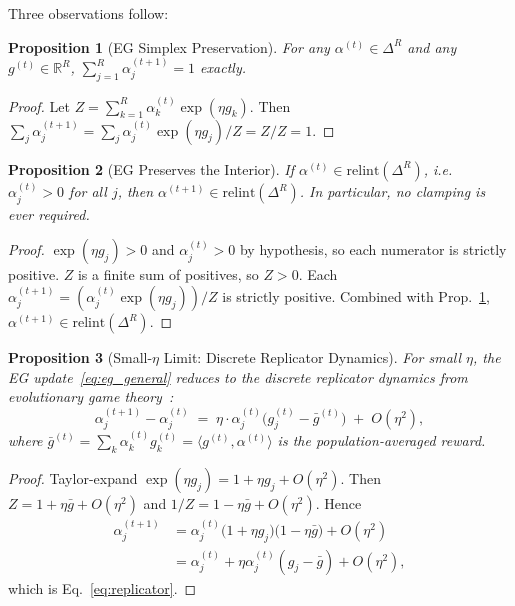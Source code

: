 \documentclass[11pt,a4paper]{article}
\theoremstyle{definition}
\theoremstyle{plain}
\newtheorem{proposition}{Proposition}[section]
\begin{document}
\noindent Three observations follow:

\begin{proposition}[EG Simplex Preservation]
\label{prop:eg_simplex}
For any $\alpha^{(t)} \in \Delta^R$ and any $g^{(t)} \in \mathbb{R}^R$,
$\sum_{j=1}^{R} \alpha_j^{(t+1)} = 1$ exactly.
\end{proposition}
\begin{proof}
Let $Z = \sum_{k=1}^{R} \alpha_k^{(t)} \exp(\eta g_k)$. Then
$\sum_j \alpha_j^{(t+1)} = \sum_j \alpha_j^{(t)} \exp(\eta g_j) / Z = Z/Z = 1$.
\end{proof}

\begin{proposition}[EG Preserves the Interior]
\label{prop:eg_interior}
If $\alpha^{(t)} \in \mathrm{relint}(\Delta^R)$, i.e.\ $\alpha_j^{(t)} > 0$
for all $j$, then $\alpha^{(t+1)} \in \mathrm{relint}(\Delta^R)$. In
particular, no clamping is ever required.
\end{proposition}
\begin{proof}
$\exp(\eta g_j) > 0$ and $\alpha_j^{(t)} > 0$ by hypothesis, so each
numerator is strictly positive. $Z$ is a finite sum of positives, so
$Z > 0$. Each $\alpha_j^{(t+1)} = (\alpha_j^{(t)} \exp(\eta g_j))/Z$
is strictly positive. Combined with Prop.~\ref{prop:eg_simplex},
$\alpha^{(t+1)} \in \mathrm{relint}(\Delta^R)$.
\end{proof}

\begin{proposition}[Small-$\eta$ Limit: Discrete Replicator Dynamics]
\label{prop:eg_replicator}
For small $\eta$, the EG update~\eqref{eq:eg_general} reduces to the
discrete replicator dynamics from evolutionary game
theory~\cite{sandholm2010population}:
\begin{equation}
\label{eq:replicator}
\alpha_j^{(t+1)} - \alpha_j^{(t)}
\;=\;
\eta \cdot \alpha_j^{(t)} \bigl( g_j^{(t)} - \bar{g}^{(t)} \bigr)
\;+\; O(\eta^2),
\end{equation}
where $\bar{g}^{(t)} = \sum_k \alpha_k^{(t)} g_k^{(t)} = \langle g^{(t)}, \alpha^{(t)}\rangle$
is the population-averaged reward.
\end{proposition}
\begin{proof}
Taylor-expand $\exp(\eta g_j) = 1 + \eta g_j + O(\eta^2)$. Then
$Z = 1 + \eta \bar{g} + O(\eta^2)$ and $1/Z = 1 - \eta \bar{g} + O(\eta^2)$.
Hence
\begin{align*}
\alpha_j^{(t+1)}
&= \alpha_j^{(t)} \bigl(1 + \eta g_j\bigr)\bigl(1 - \eta \bar{g}\bigr) + O(\eta^2)\\
&= \alpha_j^{(t)} + \eta \alpha_j^{(t)} (g_j - \bar{g}) + O(\eta^2),
\end{align*}
which is Eq.~\eqref{eq:replicator}.
\end{proof}
\end{document}
